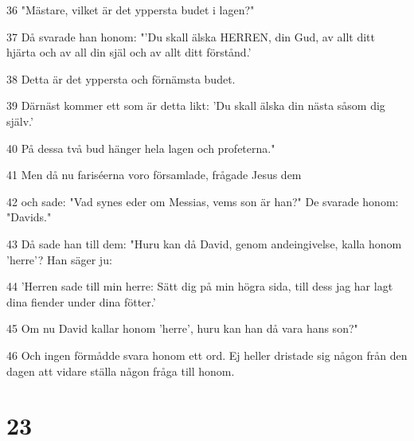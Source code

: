 \par 36 "Mästare, vilket är det yppersta budet i lagen?"
\par 37 Då svarade han honom: "'Du skall älska HERREN, din Gud, av allt ditt hjärta och av all din själ och av allt ditt förstånd.'
\par 38 Detta är det yppersta och förnämsta budet.
\par 39 Därnäst kommer ett som är detta likt: 'Du skall älska din nästa såsom dig själv.'
\par 40 På dessa två bud hänger hela lagen och profeterna."
\par 41 Men då nu fariséerna voro församlade, frågade Jesus dem
\par 42 och sade: "Vad synes eder om Messias, vems son är han?" De svarade honom: "Davids."
\par 43 Då sade han till dem: "Huru kan då David, genom andeingivelse, kalla honom 'herre'? Han säger ju:
\par 44 'Herren sade till min herre: Sätt dig på min högra sida, till dess jag har lagt dina fiender under dina fötter.'
\par 45 Om nu David kallar honom 'herre', huru kan han då vara hans son?"
\par 46 Och ingen förmådde svara honom ett ord. Ej heller dristade sig någon från den dagen att vidare ställa någon fråga till honom.

\chapter{23}

